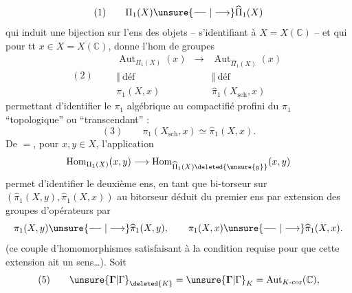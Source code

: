 \[
(1)\qquad\Pi_1(X)\unsure{\relbar\joinrel\relbar|\longrightarrow}\widehat\Pi_1(X)
\]
qui induit une bijection sur l'ens des objets  -- s'identifiant à $X=X(\mathbb C)$ -- et qui  pour tt $x\in X=X(\mathbb C)$, donne l'hom de groupes
\[
(2)\qquad
\begin{array}{ccc}
\operatorname{Aut}_{\Pi_1(X)}(x)&\longrightarrow&\operatorname{Aut}_{\widehat\Pi_1(X)}(x)\\
\Vert\ \text{déf}&&\Vert\ \text{déf}\\
\pi_1(X,x)&&\widehat\pi_1(X_{\mathrm{sch}},x)
\end{array}
\]
permettant d'identifier le $\pi_1$ algébrique au compactifié profini du $\pi_1$ ``topologique'' ou ``transcendant'' : 
\[
(3)\qquad\pi_1(X_{\mathrm{sch}},x)\simeq\widehat\pi_1(X,x).
\]
De $=$, pour $x,y\in X$, l'application
\[
\operatorname{Hom}_{\Pi_1(X)}(x,y)\longrightarrow\operatorname{Hom}_{\widehat\Pi_1(X)\deleted{\unsure{y}}}(x,y)
\]
permet d'identifier le deuxième ens, en tant que bi-torseur sur $(\widehat\pi_1(X,y),\widehat\pi_1(X,x))$ au bitorseur déduit  du premier ens par extension des groupes d'opérateurs par
\[
\pi_1(X,y)\unsure{\relbar\joinrel\relbar|\longrightarrow}\widehat\pi_1(X,y),\qquad\pi_1(X,x)\unsure{\relbar\joinrel\relbar|\longrightarrow}\widehat\pi_1(X,x).
\]
(ce couple d'homomorphismes satisfaisant  à la condition requise pour que cette extension ait un sens\ldots).
Soit
\[
(5)\qquad\unsure{\mathbf{\Gamma}|\Gamma}_{\deleted{K}}=\unsure{\mathbf{\Gamma}|\Gamma}_K=\operatorname{Aut}_{K\text{-cor}}(\mathbb C),
\]
